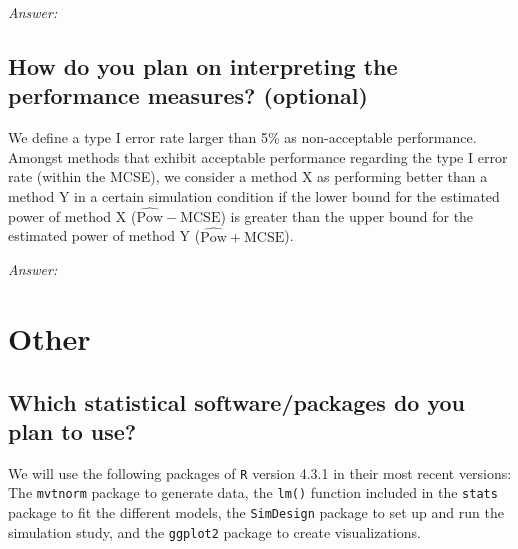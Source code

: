 \documentclass[12pt]{article}
\begin{document}
\textit{Answer:}

\subsection{How do you plan on interpreting the performance measures? \textmd{(optional)}}


\begin{examplebox}
We define a type I error rate larger than 5\% as non-acceptable performance. Amongst methods that exhibit acceptable performance regarding the type I error rate (within the MCSE), we consider a method X as performing better than a method Y in a certain simulation condition if the lower bound for the estimated power of method X ($\widehat{\text{Pow}}-\text{MCSE}$) is greater than the upper bound for the estimated power of method Y ($\widehat{\text{Pow}}+\text{MCSE}$).
\end{examplebox}

\textit{Answer:}

\section{Other}
\subsection{Which statistical software/packages do you plan to use?}


\begin{examplebox}
We will use the following packages of \texttt{R} version 4.3.1 \parencite{R2020} in their most recent versions: The \texttt{mvtnorm} package \parencite{Genz2009} to generate data, the \texttt{lm()} function included in the \texttt{stats} package \parencite{R2020} to fit the different models, the \texttt{SimDesign} package \parencite{Chalmers2020} to set up  and run the simulation study, and the \texttt{ggplot2} package \parencite{Wickham2016} to create visualizations.
\end{examplebox}
\end{document}
